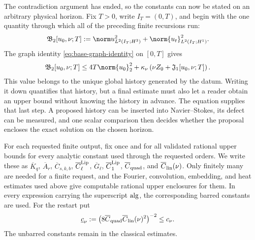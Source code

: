 The contradiction argument has ended, so the constants can now be stated on
an arbitrary physical horizon.  Fix \(T>0\), write \(I_T=(0,T)\), and begin
with the one quantity through which all of the preceding finite recursions
run:
\begin{equation}
 \mathfrak B_2[u_0,\nu;T]
 :=\norm u_{L^2(I_T;H^3)}^2
   +\norm{u_t}_{L^2(I_T;H^1)}^2.
 \label{eq:global-base-producer-value}
\end{equation}
The graph identity \eqref{eq:base-graph-identity} on \([0,T]\) gives
\begin{equation}
 \mathfrak B_2[u_0,\nu;T]
 \le4T\norm{u_0}_2^2
 +\kappa_\nu\left(
  \nu Z_0+\mathfrak J_1[u_0,\nu;T]
 \right).
 \label{eq:global-base-producer-graph-bound}
\end{equation}
This value belongs to the unique global history generated by the datum.
Writing it down quantifies that history, but a final estimate must also let a
reader obtain an upper bound without knowing the history in advance.  The
equation supplies that last step.  A proposed history can be inserted into
Navier--Stokes, its defect can be measured, and one scalar comparison then
decides whether the proposal encloses the exact solution on the chosen
horizon.

For each requested finite output, fix once and for all validated rational upper
bounds for every analytic constant used through the requested orders.  We write
these as \(\overline K_q\), \(\overline A_r\),
\(\overline C_{s,k,b}\), \(\overline C_\ell^{\rm Lip}\),
\(\overline G_\ell\), \(\overline C_1^{\rm Lip}\),
\(\overline C_{\rm quad}\), and \(\overline C_{\rm lin}(\nu)\).
Only finitely many are needed for a finite request, and the Fourier,
convolution, embedding, and heat estimates used above give computable rational
upper enclosures for them.  In every expression carrying the superscript
\({\rm alg}\), the corresponding barred constants are used.  For the restart
put
\begin{equation}
 \underline c_\nu
 :=\left(
 8\overline C_{\rm quad}\overline C_{\rm lin}(\nu)^2
 \right)^{-2}
 \le c_\nu.
 \label{eq:algorithmic-restart-constant}
\end{equation}
The unbarred constants remain in the classical estimates.

